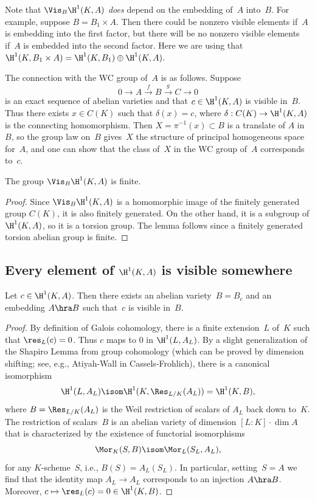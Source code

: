 \documentclass{report}
\begin{document}
\begin{remark}
Note that $\Vis_B\H^1(K,A)$ {\em does} depend on the embedding of~$A$
into~$B$.  For example, suppose $B=B_1\times A$.  Then there could be
nonzero visible elements if~$A$ is embedding into the first factor,
but there will be no nonzero visible elements if~$A$ is embedded into
the second factor.  Here we are using that $\H^1(K, B_1\times A) =
\H^1(K,B_1)\oplus \H^1(K,A).$
\end{remark}

The connection with the WC group of~$A$ is as follows.
Suppose
\[
  0 \to A \xrightarrow{f} B \xrightarrow{g} C \to 0
\]
is an exact sequence of abelian varieties and that $c\in \H^1(K,A)$ is
visible in~$B$.  Thus there exists $x\in C(K)$ such that $\delta(x) =
c$, where $\delta:C(K)\to \H^1(K,A)$ is the connecting homomorphism.
Then $X=\pi^{-1}(x)\subset B$ is a translate of $A$ in~$B$, so the
group law on~$B$ gives~$X$ the structure of principal homogeneous
space for~$A$, and one can show that the class of~$X$ in the WC group
of~$A$ corresponds to~$c$.

\begin{lemma}
The group $\Vis_B\H^1(K,A)$ is finite.
\end{lemma}
\begin{proof}
  Since $\Vis_B\H^1(K,A)$ is a homomorphic image of the finitely
  generated group $C(K)$, it is also finitely generated.  On the other
  hand, it is a subgroup of $\H^1(K,A)$, so it is a torsion group.
  The lemma follows since a finitely generated torsion abelian group
  is finite.
\end{proof}

\subsection{Every element of $\H^1(K,A)$ is visible somewhere}

\begin{proposition}\label{prop:allvish1}
Let $c\in\H^1(K,A)$.  Then there exists an abelian variety~$B=B_c$ and
an embedding $A\hra B$ such that~$c$ is visible in~$B$.
\end{proposition}
\begin{proof}
  By definition of Galois cohomology, there is a finite extension~$L$
  of~$K$ such that $\res_L(c)=0$.  Thus $c$ maps to $0$ in
  $\H^1(L,A_L)$.  By a slight generalization of the Shapiro Lemma from
  group cohomology (which can be proved by dimension shifting; see,
  e.g., Atiyah-Wall in Cassels-Frohlich), there is a
  canonical isomorphism
  \[
  \H^1(L,A_L) \isom \H^1(K,\Res_{L/K}(A_L)) = \H^1(K,B),
  \]
  where $B=\Res_{L/K}(A_L)$ is the Weil restriction of scalars of
  $A_L$ back down to~$K$.  The restriction of scalars~$B$ is an
  abelian variety of dimension $[L:K]\cdot \dim A$ that is
  characterized by the existence of functorial isomorphisms
  \[
   \Mor_K(S,B) \isom \Mor_L(S_L, A_L),
  \]
  for any $K$-scheme~$S$, i.e., $B(S)=A_L(S_L)$.  In particular,
  setting~$S=A$ we find that the identity map $A_L\to A_L$ corresponds
  to an injection $A\hra B$.  Moreover,
  $c\mapsto\res_L(c)=0\in\H^1(K,B)$.
\end{proof}
\end{document}
